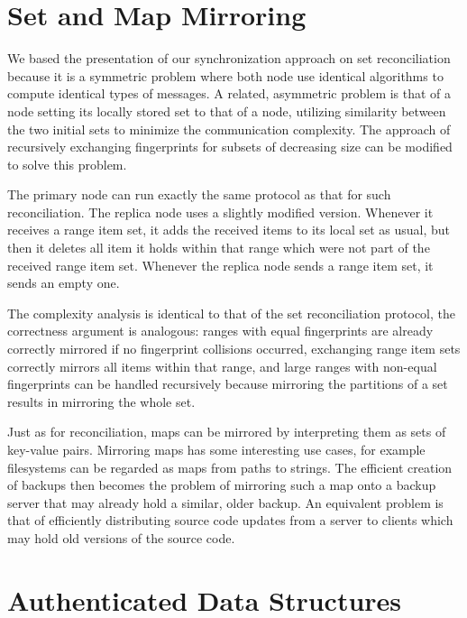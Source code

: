 \section{Set and Map Mirroring}
\label{set-mirror}

We based the presentation of our synchronization approach on set reconciliation because it is a symmetric problem where both node use identical algorithms to compute identical types of messages. A related, asymmetric problem is that of a  node setting its locally stored set to that of a  node, utilizing similarity between the two initial sets to minimize the communication complexity. The approach of recursively exchanging fingerprints for subsets of decreasing size can be modified to solve this  problem.

The primary node can run exactly the same protocol as that for such reconciliation. The replica node uses a slightly modified version. Whenever it receives a range item set, it adds the received items to its local set as usual, but then it deletes all item it holds within that range which were not part of the received range item set. Whenever the replica node sends a range item set, it sends an empty one.

The complexity analysis is identical to that of the set reconciliation protocol, the correctness argument is analogous: ranges with equal fingerprints are already correctly mirrored if no fingerprint collisions occurred, exchanging range item sets correctly mirrors all items within that range, and large ranges with non-equal fingerprints can be handled recursively because mirroring the partitions of a set results in mirroring the whole set.

Just as for reconciliation, maps can be mirrored by interpreting them as sets of key-value pairs. Mirroring maps has some interesting use cases, for example filesystems can be regarded as maps from paths to strings. The efficient creation of backups then becomes the problem of mirroring such a map onto a backup server that may already hold a similar, older backup. An equivalent problem is that of efficiently distributing source code updates from a server to clients which may hold old versions of the source code.

\section{Authenticated Data Structures}
\label{authenticated}

